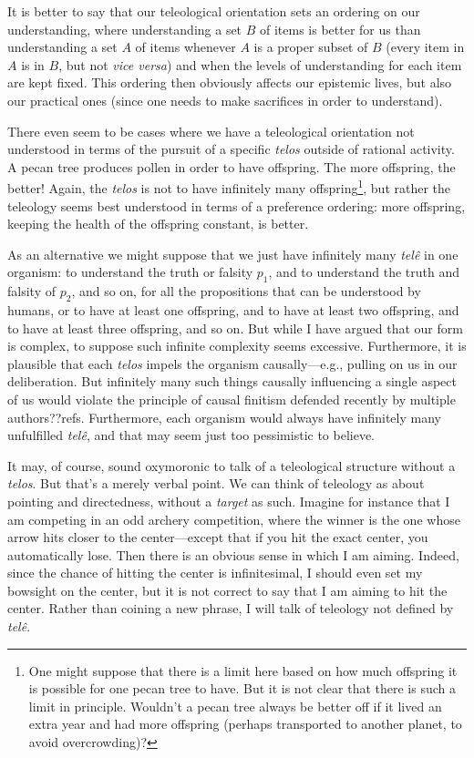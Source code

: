 It is better to say that our teleological orientation sets an ordering on our understanding, where understanding a set
$B$ of items is better for us than understanding a set $A$ of items whenever $A$ is a proper subset of $B$ (every item in $A$ is
in $B$, but not \textit{vice versa}) and when the levels of understanding for each item are kept fixed. This ordering then obviously
affects our epistemic lives, but also our practical ones (since one needs to make sacrifices in order to understand).

There even seem to be cases where we have a teleological orientation not understood in terms of the pursuit of a specific \textit{telos}
outside of rational activity. A pecan tree produces pollen in order to have offspring. The more offspring, the better! Again, the 
\textit{telos} is not to have infinitely many offspring\footnote{One might suppose that there is a limit here based on how much offspring
it is possible for one pecan tree to have. But it is not clear that there is such a limit in principle. Wouldn't a pecan tree always be better
off if it lived an extra year and had more offspring (perhaps transported to another planet, to avoid overcrowding)?}, but rather the teleology
seems best understood in terms of a preference ordering: more offspring, keeping the health of the offspring constant, is better.

As an alternative we might suppose that we just have infinitely many \textit{tel\^e} in one organism: to understand the truth or falsity $p_1$, 
and to understand the truth and falsity of $p_2$, and so on, for all the propositions that can be understood by humans, or to have
at least one offspring, and to have at least two offspring, and to have at least three offspring, and so on. But while I have argued that our form is 
complex, to suppose such infinite complexity seems excessive. Furthermore, it is plausible that each \textit{telos} impels the organism
causally---e.g., pulling on us in our deliberation. But infinitely many such things causally influencing a single aspect of us would violate 
the principle of causal finitism defended recently by multiple authors??refs. Furthermore, each organism would always have infinitely 
many unfulfilled \textit{tel\^e}, and that may seem just too pessimistic to believe.

It may, of course, sound oxymoronic to talk of a teleological structure without a \textit{telos}. But that's a merely verbal point. We can
think of teleology as about pointing and directedness, without a \textit{target} as such. Imagine for instance that I am competing in an 
odd archery competition, where the winner is the one whose arrow hits closer to the center---except that if you hit the exact center, you
automatically lose. Then there is an obvious sense in which I am aiming. Indeed, since the chance of hitting the center is infinitesimal,
I should even set my bowsight on the center, but it is not correct to say that I am aiming to hit the center. Rather than coining a new
phrase, I will talk of teleology not defined by \textit{tel\^e}.

